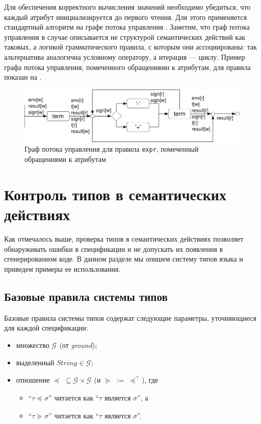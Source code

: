 Для обеспечения корректного вычисления значений необходимо убедиться, что каждый атрибут инициализируется до первого чтения. Для этого применяется стандартный алгоритм на графе потока управления \cite{???}. 
Заметим, что граф потока управления в случае \ATF{} описывается не структурой семантических действий как таковых, а логикой грамматического правила, с которым они ассоциированы: так альтернатива аналогична условному оператору, а итерация --- циклу. Пример графа потока управления, помеченного обращениями к атрибутам, для правила  показан на .
\begin{figure}[htbp]
	\centering
	\includegraphics[width=\textwidth]{cfg.pdf}
	\caption{Граф потока управления для правила \texttt{expr}, помеченный обращениями к атрибутам}\label{cfg}
\end{figure}

\chapter{Контроль типов в семантических действиях}

Как отмечалось выше, проверка типов в семантических действиях позволяет обнаруживать ошибки в спецификации и не допускать их появления в сгенерированном коде. В данном разделе мы опишем систему типов языка \ATF{} и приведем примеры ее использования.

\section{Базовые правила системы типов}

\renewcommand{\L}{{}}
\newcommand{\G}{ {\mathcal{G}_\L} }
\newcommand{\eql}{\cong_\L}
\newcommand{\lel}{\preceq_\L}
\newcommand{\gel}{\succeq_\L}
\newcommand{\TUP}{TupleType}
\newcommand{\Str}{String_\L}

Базовые правила системы типов \ATF{} содержат следующие параметры, уточняющиеся для каждой спецификации:
\begin{itemize}
\item множество  $\G$ (от \emph{ground});
\item выделенный  $\Str \in \G$;
\item отношение $\lel \;\subseteq \G \times \G$ (и $\gel \;:=\; \lel^{\top}$), где 
	\begin{itemize}
	\item ``$\tau \lel \sigma$''
читается как ``$\tau$ является  $\sigma$'', а
	\item ``$\tau \gel \sigma$''
читается как ``$\tau$ является  $\sigma$''.
	\end{itemize}
\end{itemize}

